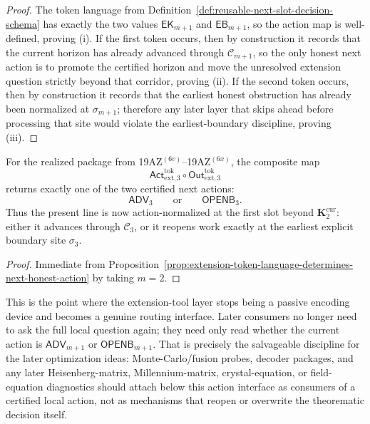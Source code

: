 \begin{proof}
The token language from Definition~\ref{def:reusable-next-slot-decision-schema} has exactly the two values \(\mathsf{EK}_{m+1}\) and \(\mathsf{EB}_{m+1}\), so the action map is well-defined, proving (i). If the first token occurs, then by construction it records that the current horizon has already advanced through \(\mathcal C_{m+1}\), so the only honest next action is to promote the certified horizon and move the unresolved extension question strictly beyond that corridor, proving (ii). If the second token occurs, then by construction it records that the earliest honest obstruction has already been normalized at \(\sigma_{m+1}\); therefore any later layer that skips ahead before processing that site would violate the earliest-boundary discipline, proving (iii).
\end{proof}

\begin{corollary}
\label{cor:sigma3-token-package-now-induces-certified-next-action-split}
For the realized package from 19AZ$^{(6v)}$--19AZ$^{(6x)}$, the composite map
\[
  \mathsf{Act}^{\mathrm{tok}}_{\mathrm{ext},3}\circ \mathsf{Out}^{\mathrm{tok}}_{\mathrm{ext},3}
\]
returns exactly one of the two certified next actions:
\[
  \mathsf{ADV}_3
  \qquad\text{or}\qquad
  \mathsf{OPENB}_3.
\]
Thus the present line is now action-normalized at the first slot beyond \(\mathbf K_2^{\mathrm{cur}}\): either it advances through \(\mathcal C_3\), or it reopens work exactly at the earliest explicit boundary site \(\sigma_3\).
\end{corollary}

\begin{proof}
Immediate from Proposition~\ref{prop:extension-token-language-determines-next-honest-action} by taking \(m=2\).
\end{proof}

\begin{remark}
\label{rem:what-this-action-map-now-buys-and-what-can-be-salvaged-into-later-layers}
This is the point where the extension-tool layer stops being a passive encoding device and becomes a genuine routing interface. Later consumers no longer need to ask the full local question again; they need only read whether the current action is \(\mathsf{ADV}_{m+1}\) or \(\mathsf{OPENB}_{m+1}\). That is precisely the salvageable discipline for the later optimization ideas: Monte-Carlo/fusion probes, decoder packages, and any later Heisenberg-matrix, Millennium-matrix, crystal-equation, or field-equation diagnostics should attach below this action interface as consumers of a certified local action, not as mechanisms that reopen or overwrite the theorematic decision itself.
\end{remark}


